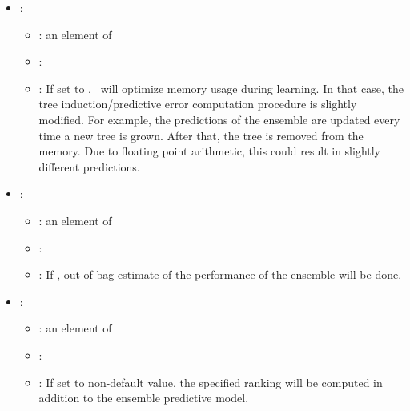 \begin{itemize}
\begin{itemize}
           \end{itemize}
    \item {}:
           \begin{itemize}
                \item \optionPossibleValues{}: an element of 
                \item \optionDefaultValue{}: 
                \item \optionDescrption{}: If set to , \clus\ will optimize memory usage during learning. In that case, the tree induction/predictive error computation procedure is slightly modified.
                For example, the predictions of the ensemble are updated every time a new tree is grown.
                After that, the tree is removed from the memory. Due to floating point arithmetic, this could result in slightly different predictions.
           \end{itemize}
    \item {}:
           \begin{itemize}
                \item \optionPossibleValues{}: an element of 
                \item \optionDefaultValue{}: 
                \item \optionDescrption{}:  If , out-of-bag estimate of the performance of the ensemble will be done.
           \end{itemize}
    \item {}:
           \begin{itemize}
                \item \optionPossibleValues{}:  an element of 
                \item \optionDefaultValue{}: 
                \item \optionDescrption{}: If set to non-default value, the specified ranking will be computed in addition to the ensemble predictive model.
                    \begin{itemize}

\end{itemize}
\end{itemize}
\end{itemize}
